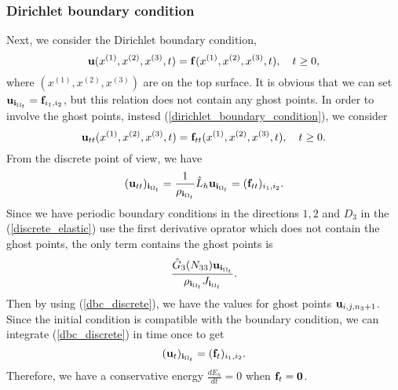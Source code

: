 \subsubsection{Dirichlet boundary condition}
Next, we consider the Dirichlet boundary condition, 
\begin{equation}\label{dirichlet_boundary_condition}
{\bf u}(x^{(1)},x^{(2)},x^{(3)},t) = {\bf f}(x^{(1)},x^{(2)},x^{(3)},t),  \ \ \ t \geq 0,
\end{equation}
where $(x^{(1)},x^{(2)},x^{(3)})$ are on the top surface. It is obvious that we can set ${\bf u}_{{\bf i}_{\Omega_t}} = {\bf f}_{i_1,i_2}$, but this relation does not contain any ghost points. In order to involve the ghost points, instesd (\ref{dirichlet_boundary_condition}), we consider
\begin{equation}
{\bf u}_{tt}(x^{(1)},x^{(2)},x^{(3)},t) = {\bf f}_{tt}(x^{(1)},x^{(2)},x^{(3)},t),  \ \ \ t \geq 0.
\end{equation}
From the discrete point of view, we have
\begin{equation}\label{dbc_discrete}
({\bf u}_{tt})_{{\bf i}_{\Omega_t}}=\frac{1}{\rho_{{\bf i}_{\Omega_t}}} \hat{L}_h{\bf u}_{{\bf i}_{\Omega_t}} = ({\bf f}_{tt})_{i_1,i_2}.
\end{equation}
Since we have periodic boundary conditions in the directions $1,2$ and $D_3$ in the (\ref{discrete_elastic}) use the first derivative oprator which does not contain the ghost points, the only term contains the ghost points is 
\[\frac{\hat{G}_3(N_{33}){\bf u}_{{\bf i}_{\Omega_t}}}{\rho_{{\bf i}_{\Omega_t}}J_{{\bf i}_{\Omega_t}}}.\]
Then by using (\ref{dbc_discrete}), we have the values for ghost points ${\bf u}_{i,j,n_3+1}$. Since the initial condition is compatible with the boundary condition, we can integrate (\ref{dbc_discrete}) in time once to get
\[({\bf u}_t)_{{\bf i}_{\Omega_t}} = ({\bf f}_t)_{i_1,i_2}.\]
Therefore, we have a conservative energy $\frac{dE_h}{dt} = 0$ when ${\bf f}_t = {\bf 0}$.